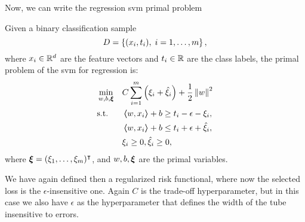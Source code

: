 Now, we can write the regression \acrshort{svm} primal problem
\begin{definition}
    Given a binary classification sample
    $$ D = \left\{(x_i, t_i), \; i=1, \ldots, m\right\} ,$$
    where $x_i \in \mathbb{R}^d$ are the feature vectors and $t_i \in \mathbb{R}$ are the class labels, 
    the primal problem of the \acrshort{svm} for regression is:
    \begin{equation}
        \label{eq:linear_primal_reg}
        \begin{aligned}
            &\min_{w, b, \fv{\xi}} & & C \sum_{i=1}^m \left(\xi_i + \hat{\xi}_i\right) + \frac{1}{2} \norm{w}^2 \\
            & \text{s.t.} & & \dotp{w}{x_i} + b \geq t_i - \epsilon - \xi_i  , \\
            & & & \dotp{w}{x_i} + b \leq t_i + \epsilon + \hat{\xi}_i , \\
            & & & \xi_i \geq 0 , \hat{\xi}_i \geq 0 ,      
        \end{aligned}  
    \end{equation}
    where $\bm{\xi} = (\xi_1, \ldots, \xi_m)^\intercal$, and $w, b, \bm{\xi}$ are the primal variables.
\end{definition}
We have again defined then a regularized risk functional, where now the selected loss is the $\epsilon$-insensitive one. Again $C$ is the trade-off hyperparameter, but in this case we also have $\epsilon$ as the hyperparameter that defines the width of the tube insensitive to errors.


